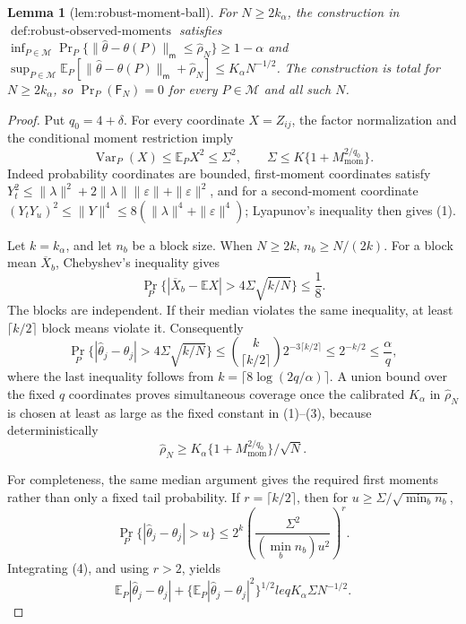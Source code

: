 \documentclass{article}
\newtheorem{lemma}{Lemma}
\begin{document}
\begin{lemma}[lem:robust-moment-ball]\label{lem:robust-moment-ball}
For \(N\ge2k_\alpha\), the construction in \(\operatorname{def:robust-observed-moments}\) satisfies \(\inf_{P\in\mathcal M}\Pr_P\{\|\widehat\theta-\theta(P)\|_{\mathsf m}\le\widehat\rho_N\}\ge1-\alpha\) and \(\sup_{P\in\mathcal M}\mathbb E_P[\|\widehat\theta-\theta(P)\|_{\mathsf m}+\widehat\rho_N]\le K_\alpha N^{-1/2}\). The construction is total for \(N\ge2k_\alpha\), so \(\Pr_P(\mathsf F_N)=0\) for every \(P\in\mathcal M\) and all such \(N\).
\end{lemma}
\begin{proof}
Put \(q_0=4+\delta\). For every coordinate \(X=Z_{ij}\), the factor normalization and the conditional moment restriction imply
\[
\operatorname{Var}_P(X)\leq\mathbb E_PX^2\leq \Sigma^2,
\qquad
\Sigma\leq K\{1+M_{\mathrm{mom}}^{2/q_0}\}. \tag{1}
\]
Indeed probability coordinates are bounded, first-moment coordinates satisfy \(Y_t^2\leq\|\lambda\|^2+2\|\lambda\|\|\varepsilon\|+\|\varepsilon\|^2\), and for a second-moment coordinate \((Y_tY_u)^2\leq\|Y\|^4\leq8(\|\lambda\|^4+\|\varepsilon\|^4)\); Lyapunov's inequality then gives (1).

Let \(k=k_\alpha\), and let \(n_b\) be a block size. When \(N\geq2k\), \(n_b\geq N/(2k)\). For a block mean \(\overline X_b\), Chebyshev's inequality gives
\[
\Pr_P\{|\overline X_b-\mathbb EX|>4\Sigma\sqrt{k/N}\}\leq\frac18. \tag{2}
\]
The blocks are independent. If their median violates the same inequality, at least \(\lceil k/2\rceil\) block means violate it. Consequently
\[
\Pr_P\{|\widehat\theta_j-\theta_j|>4\Sigma\sqrt{k/N}\}
\leq \binom{k}{\lceil k/2\rceil}2^{-3\lceil k/2\rceil}
\leq2^{-k/2}\leq\frac\alpha q, \tag{3}
\]
where the last inequality follows from \(k=\lceil8\log(2q/\alpha)\rceil\). A union bound over the fixed \(q\) coordinates proves simultaneous coverage once the calibrated \(K_\alpha\) in \(\widehat\rho_N\) is chosen at least as large as the fixed constant in (1)--(3), because deterministically
\[
\widehat\rho_N\geq K_\alpha\{1+M_{\mathrm{mom}}^{2/q_0}\}/\sqrt N.
\]

For completeness, the same median argument gives the required first moments rather than only a fixed tail probability. If \(r=\lceil k/2\rceil\), then for \(u\geq\Sigma/\sqrt{\min_b n_b}\),
\[
\Pr_P\{|\widehat\theta_j-\theta_j|>u\}
\leq2^k\left(\frac{\Sigma^2}{(\min_b n_b)u^2}\right)^r. \tag{4}
\]
Integrating (4), and using \(r>2\), yields
\[
\mathbb E_P|\widehat\theta_j-\theta_j|+\{\mathbb E_P|\widehat\theta_j-\theta_j|^2\}^{1/2}leq K_\alpha\Sigma N^{-1/2}. \tag{5}
\]


\end{proof}
\end{document}
